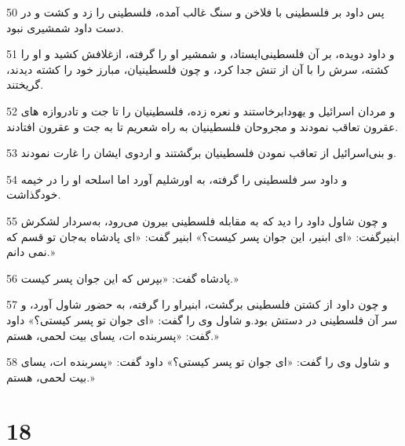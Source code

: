 \par 50 پس داود بر فلسطینی با فلاخن و سنگ غالب آمده، فلسطینی را زد و کشت و در دست داود شمشیری نبود.
\par 51 و داود دویده، بر آن فلسطینی‌ایستاد، و شمشیر او را گرفته، ازغلافش کشید و او را کشته، سرش را با آن از تنش جدا کرد، و چون فلسطینیان، مبارز خود را کشته دیدند، گریختند.
\par 52 و مردان اسرائیل و یهودابرخاستند و نعره زده، فلسطینیان را تا جت و تادروازه های عقرون تعاقب نمودند و مجروحان فلسطینیان به راه شعریم تا به جت و عقرون افتادند.
\par 53 و بنی‌اسرائیل از تعاقب نمودن فلسطینیان برگشتند و اردوی ایشان را غارت نمودند.
\par 54 و داود سر فلسطینی را گرفته، به اورشلیم آورد اما اسلحه او را در خیمه خودگذاشت.
\par 55 و چون شاول داود را دید که به مقابله فلسطینی بیرون می‌رود، به‌سردار لشکرش ابنیرگفت: «ای ابنیر، این جوان پسر کیست؟» ابنیر گفت: «ای پادشاه به‌جان تو قسم که نمی دانم.»
\par 56 پادشاه گفت: «بپرس که این جوان پسر کیست.»
\par 57 و چون داود از کشتن فلسطینی برگشت، ابنیراو را گرفته، به حضور شاول آورد، و سر آن فلسطینی در دستش بود.و شاول وی را گفت: «ای جوان تو پسر کیستی؟» داود گفت: «پسربنده ات، یسای بیت لحمی، هستم.»
\par 58 و شاول وی را گفت: «ای جوان تو پسر کیستی؟» داود گفت: «پسربنده ات، یسای بیت لحمی، هستم.»
 
\chapter{18}

